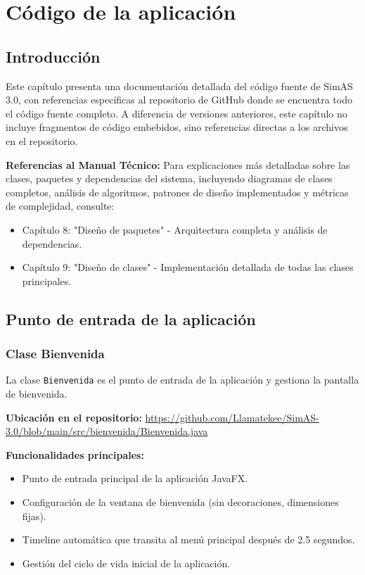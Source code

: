 \chapter{Código de la aplicación}\label{cap-documentacion-interna}

\section{Introducción}

Este capítulo presenta una documentación detallada del código fuente de SimAS 3.0, con referencias específicas al repositorio de GitHub donde se encuentra todo el código fuente completo. A diferencia de versiones anteriores, este capítulo no incluye fragmentos de código embebidos, sino referencias directas a los archivos en el repositorio.

\textbf{Referencias al Manual Técnico:} Para explicaciones más detalladas sobre las clases, paquetes y dependencias del sistema, incluyendo diagramas de clases completos, análisis de algoritmos, patrones de diseño implementados y métricas de complejidad, consulte:
\begin{itemize}
    \item Capítulo 8: "Diseño de paquetes" - Arquitectura completa y análisis de dependencias.
    \item Capítulo 9: "Diseño de clases" - Implementación detallada de todas las clases principales.
\end{itemize}

\section{Punto de entrada de la aplicación}

\subsection{Clase Bienvenida}

La clase \texttt{Bienvenida} es el punto de entrada de la aplicación y gestiona la pantalla de bienvenida.

\textbf{Ubicación en el repositorio:} \url{https://github.com/Llamatekee/SimAS-3.0/blob/main/src/bienvenida/Bienvenida.java}

\textbf{Funcionalidades principales:}

\begin{itemize}
    \item Punto de entrada principal de la aplicación JavaFX.
    \item Configuración de la ventana de bienvenida (sin decoraciones, dimensiones fijas).
    \item Timeline automática que transita al menú principal después de 2.5 segundos.
    \item Gestión del ciclo de vida inicial de la aplicación.
\end{itemize}

